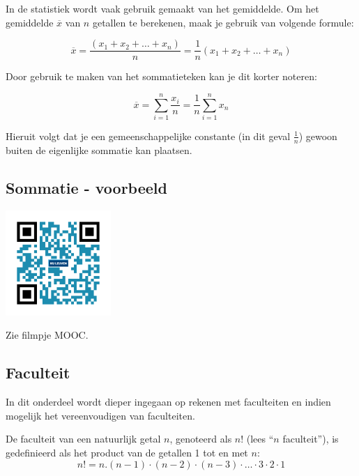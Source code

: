 In de statistiek wordt vaak gebruik gemaakt van het gemiddelde. Om het gemiddelde $\overline{x}$ van $n$ getallen te berekenen, maak je gebruik van volgende formule:

\begin{equation*}
\overline{x} = \frac{(x_1+x_2+\ldots+x_n)}{n}=\frac{1}{n}(x_1+x_2+\ldots+x_n)
\end{equation*}

Door gebruik te maken van het sommatieteken kan je dit korter noteren:

\begin{equation*}
\overline{x}=\sum_{i=1}^{n}\frac{x_i}{n} = \frac{1}{n} \sum_{i=1}^{n} x_n
\end{equation*}

Hieruit volgt dat je een gemeenschappelijke constante (in dit geval $\frac{1}{n}$) gewoon buiten de eigenlijke sommatie kan plaatsen.



\subsection{Sommatie - voorbeeld}
\begin{minipage}{.25\linewidth}
	\raggedright
	\includegraphics[width=4cm]{1_elem_rekenvaardigheden_A/inputs/QR_Code_SOMMATIE_module_1}
\end{minipage}
\begin{minipage}{.7\linewidth}
	Zie filmpje MOOC.
\end{minipage}

\subsection{Faculteit}
In dit onderdeel wordt dieper ingegaan op rekenen met faculteiten en indien mogelijk het vereenvoudigen van faculteiten.

\begin{definitie}
	De faculteit van een natuurlijk getal $n$, genoteerd als $n!$ (lees “$n$ faculteit”), is gedefinieerd als het product van de getallen 1 tot en met $n$:
	\begin{equation*}
	n!=n.(n-1)\cdot(n-2)\cdot(n-3)\cdot\ldots\cdot 3\cdot 2\cdot 1
	\end{equation*}
\end{definitie}

